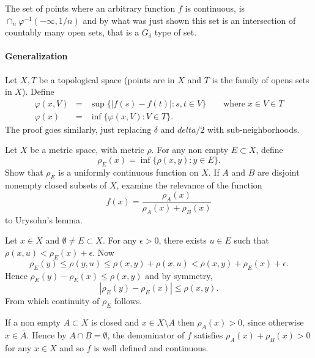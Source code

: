 \begin{enumerate}
The set of points where an arbitrary function $f$ is continuous, is
 \(\cap_n \varphi^{-1}(-\infty, 1/n)\) and by what was just shown
this set is an intersection of countably many open sets, that is
a \(G_\delta\) type of set.

\paragraph{Generalization} Let \(X,T\) be a topological space
(points are in $X$ and $T$ is the family of opens sets in $X$).
Define
\begin{eqnarray*}
 \varphi(x,V) & = & \sup\{|f(s) - f(t)|: s,t\in V\}
                             \qquad \textrm{where}\; x\in V\in T\\
 \varphi(x)        & = & \inf\{\varphi(x,V): V\in T\}.
\end{eqnarray*}
The proof goes similarly, just replacing \(\delta\) and \(delta/2\)
with sub-neighborhoods.


\begin{excopy}
Let $X$ be a metric space, with metric \(\rho\).
For any non empty \(E\subset X\), define
\begin{equation*}
 \rho_E(x) = \inf\{\rho(x,y): y\in E\}.
\end{equation*}
Show that \(\rho_E\) is a uniformly continuous function on $X$.
If $A$ and $B$ are disjoint nonempty closed subsets of $X$, examine
the relevance of the function
\begin{equation*}
  f(x) = \frac{\rho_A(x)}{\rho_A(x) +  \rho_B(x)}
\end{equation*}
to Urysohn's lemma.
\end{excopy}

Let \(x\in X\) and \(\emptyset \neq E \subset X\).
For any \(\epsilon>0\), there exists \(u\in E\) such that
\(\rho(x,u) < \rho_E(x) + \epsilon\).
Now
\begin{equation*}
\rho_E(y) \leq \rho(y,u)
          \leq \rho(x,y) + \rho(x,u)
             < \rho(x,y) + \rho_E(x) + \epsilon.
\end{equation*}
Hence \(\rho_E(y) - \rho_E(x) \leq \rho(x,y)\) and by symmetry,
\begin{equation*}
|\rho_E(y) - \rho_E(x)| \leq \rho(x,y).
\end{equation*}
From which continuity of \(\rho_E\) follows.

If a non empty \(A\subset X\) is closed and \(x\in X\setminus A\)
then \(\rho_A(x) > 0\), since otherwise \(x\in \overline{A}\).
Hence by \(A\cap B = \emptyset\), the denominator of $f$ satisfies
\(\rho_A(x)+\rho_B(x) > 0\) for any \(x\in X\) and so $f$ is
well defined and continuous.


\end{enumerate}

